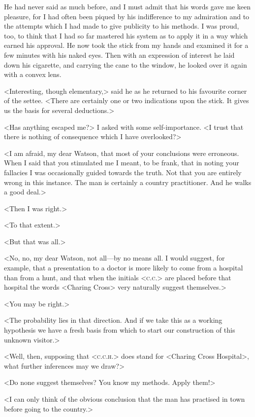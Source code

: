 He had never said as much before, and I must admit that his words gave me keen pleasure, for I had often been piqued by his indifference to my admiration and to the attempts which I had made to give publicity to his methods. I was proud, too, to think that I had so far mastered his system as to apply it in a way which earned his approval. He now took the stick from my hands and examined it for a few minutes with his naked eyes. Then with an expression of interest he laid down his cigarette, and carrying the cane to the window, he looked over it again with a convex lens.


<Interesting, though elementary,> said he as he returned to his favourite corner of the settee. <There are certainly one or two indications upon the stick. It gives us the basis for several deductions.>

<Has anything escaped me?> I asked with some self-importance. <I trust that there is nothing of consequence which I have overlooked?>

<I am afraid, my dear Watson, that most of your conclusions were erroneous. When I said that you stimulated me I meant, to be frank, that in noting your fallacies I was occasionally guided towards the truth. Not that you are entirely wrong in this instance. The man is certainly a country practitioner. And he walks a good deal.>

<Then I was right.>

<To that extent.>

<But that was all.>

<No, no, my dear Watson, not all—by no means all. I would suggest, for example, that a presentation to a doctor is more likely to come from a hospital than from a hunt, and that when the initials <\textsc{c.c.}> are placed before that hospital the words <Charing Cross> very naturally suggest themselves.>

<You may be right.>

<The probability lies in that direction. And if we take this as a working hypothesis we have a fresh basis from which to start our construction of this unknown visitor.>

<Well, then, supposing that <\textsc{c.c.h.}> does stand for <Charing Cross Hospital>, what further inferences may we draw?>

<Do none suggest themselves? You know my methods. Apply them!>

<I can only think of the obvious conclusion that the man has practised in town before going to the country.>

